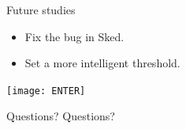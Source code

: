 \documentclass{beamer}
\begin{document}
    \begin{frame}{Future studies}
        \begin{itemize}[<+-|alert@+>]
            \item Fix the bug in Sked.
            \item Set a more intelligent threshold.
        \end{itemize}
    \end{frame}
    \begin{frame}
        \centering
        \texttt{[image: ENTER]}
    \end{frame}
    \begin{frame}{Questions?}
        \centering
        Questions?
    \end{frame}



%
%
%
\end{document}
